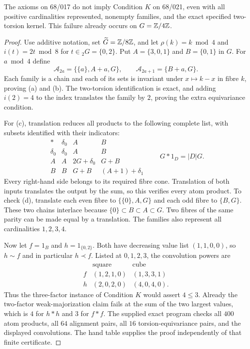 \begin{theorem}\label{C-K-counter}
The axioms on 68/017 do not imply Condition $K$ on 68/021, even with all
positive cardinalities represented, nonempty families, and the exact
specified two-torsion kernel. This failure already occurs on $G={\mathbb{Z}}/4{\mathbb{Z}}$.
\end{theorem}
\begin{proof}
Use additive notation, set $\widetilde G={\mathbb{Z}}/8{\mathbb{Z}}$, and let
$\rho(k)=k\bmod4$ and $i(t)=2t\bmod8$ for $t\in{}_2G=\{0,2\}$.
Put $A=\{3,0,1\}$ and $B=\{0,1\}$ in $G$. For $a\bmod4$ define
\[
 \mathcal A_{2a}=\{\{a\},A+a,G\},\qquad
 \mathcal A_{2a+1}=\{B+a,G\}.
\]
Each family is a chain and each of its sets is invariant under
$x\mapsto k-x$ in fibre $k$, proving (a) and (b). The two-torsion
identification is exact, and adding $i(2)=4$ to the index translates the
family by $2$, proving the extra equivariance condition.

For (c), translation reduces all products to the following complete
list, with subsets identified with their indicators:
\[
 \begin{array}{c|ccc}
 *&\delta_0&A&B\\ \hline
 \delta_0&\delta_0&A&B\\
 A&A&2G+\delta_0&G+B\\
 B&B&G+B&(A+1)+\delta_1
 \end{array}
 \qquad G*1_D=|D|G.
\]
Every right-hand side belongs to its required fibre cone. Translation of
both inputs translates the output by the sum, so this verifies every
atom product. To check (d), translate each even fibre to
$\{\{0\},A,G\}$ and each odd fibre to $\{B,G\}$.
These two chains interlace because $\{0\}\subset B\subset A\subset G$.
Two fibres of the same parity can be made equal by a translation.
The families also represent all cardinalities $1,2,3,4$.

Now let $f=1_B$ and $h=1_{\{0,2\}}$. Both have decreasing value list
$(1,1,0,0)$, so $h\sim f$ and in particular $h\prec f$. Listed at
$0,1,2,3$, the convolution powers are
\[
 \begin{array}{c|cc}
       &\text{square}&\text{cube}\\ \hline
 f &(1,2,1,0)&(1,3,3,1)\\
 h &(2,0,2,0)&(4,0,4,0).
 \end{array}
\]
Thus the three-factor instance of Condition $K$ would assert $4\leq3$.
Already the two-factor weak-majorization claim fails at the sum of the
two largest values, which is $4$ for $h*h$ and $3$ for $f*f$.
The supplied exact program checks all $400$ atom products, all $64$
alignment pairs, all $16$ torsion-equivariance pairs, and the displayed
convolutions. The hand table supplies the proof independently of that
finite certificate.
\end{proof}

